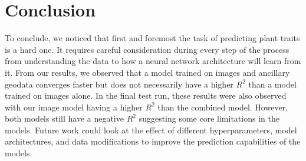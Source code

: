 \documentclass[12pt,a4paper,oneside]{article}
\begin{document}
\section{Conclusion}
To conclude, we noticed that first and foremost the task of predicting plant traits is a hard one. It requires careful consideration during every step of the process from understanding the data to how a neural network architecture will learn from it. From our results, we observed that a model trained on images and ancillary geodata converges faster but does not necessarily have a higher $R^2$ than a model trained on images alone. In the final test run, these results were also observed with our image model having a higher $R^2$ than the combined model. However, both models still have a negative $R^2$ suggesting some core limitations in the models. Future work could look at the effect of different hyperparameters, model architectures, and data modifications to improve the prediction capabilities of the models.   

\printbibliography
\end{document}
